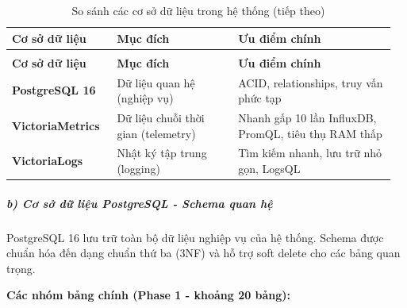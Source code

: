 \documentclass[a4paper]{extarticle}
\newcommand{\thesissettableid}[2]{%
  \renewcommand{\thetable}{#1}%
  \renewcommand{\theHtable}{#2}%
}
\begin{document}
{\thesissettableid{3.18}{tab-ch3-so-sanh-cac-co-so-du-lieu-trong-he-thong}
\def\LTcaptype{table}
\begin{longtable}{|L{0.269\linewidth}|L{0.305\linewidth}|L{0.390\linewidth}|}
\caption{So sánh các cơ sở dữ liệu trong hệ thống}\label{tab:ch3-so-sanh-cac-co-so-du-lieu-trong-he-thong}\\
\hline \textbf{Cơ sở dữ liệu} & \textbf{Mục đích} & \textbf{Ưu điểm chính} \\
\hline
\endfirsthead
\caption[]{So sánh các cơ sở dữ liệu trong hệ thống (tiếp theo)}\\
\hline \textbf{Cơ sở dữ liệu} & \textbf{Mục đích} & \textbf{Ưu điểm chính} \\
\hline
\endhead
\hline
\endfoot
\endlastfoot
\textbf{PostgreSQL 16} & Dữ liệu quan hệ (nghiệp vụ) & ACID,
relationships, truy vấn phức tạp \\\hline
\textbf{VictoriaMetrics} & Dữ liệu chuỗi thời gian (telemetry) & Nhanh
gấp 10 lần InfluxDB, PromQL, tiêu thụ RAM thấp \\\hline
\textbf{VictoriaLogs} & Nhật ký tập trung (logging) & Tìm kiếm nhanh,
lưu trữ nhỏ gọn, LogsQL \\\hline
\end{longtable}
}


\subparagraph{b) Cơ sở dữ liệu PostgreSQL - Schema quan
hệ}\label{b-cux1a1-sux1edf-dux1eef-liux1ec7u-postgresql---schema-quan-hux1ec7}

PostgreSQL 16 lưu trữ toàn bộ dữ liệu nghiệp vụ của hệ thống. Schema
được chuẩn hóa đến dạng chuẩn thứ ba (3NF) và hỗ trợ soft delete cho các
bảng quan trọng.

\textbf{Các nhóm bảng chính (Phase 1 - khoảng 20 bảng):}
\end{document}
